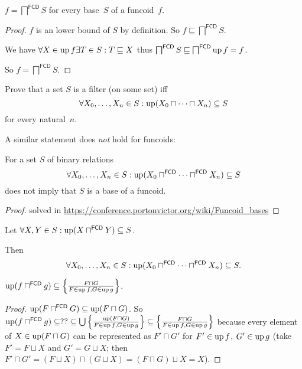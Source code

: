 \begin{prop}
$f = \bigsqcap^{\mathsf{FCD}} S$ for every base~$S$ of a funcoid~$f$.
\end{prop}

\begin{proof}
$f$ is an lower bound of $S$ by definition. So $f \sqsubseteq
\bigsqcap^{\mathsf{FCD}} S$.

We have $\forall X \in \operatorname{up} f \exists T \in S : T \sqsubseteq X$ thus
$\bigsqcap^{\mathsf{FCD}} S \sqsubseteq \bigsqcap^{\mathsf{FCD}}
\operatorname{up} f = f$.

So $f = \bigsqcap^{\mathsf{FCD}} S$.
\end{proof}

\begin{xca}
Prove that a set $S$ is a filter (on some set) iff
\[ \forall X_0,\dots,X_n\in S:\operatorname{up}(X_0\sqcap\dots\sqcap X_n)\subseteq S \]
for every natural~$n$.
\end{xca}

A similar statement does \emph{not} hold for funcoids:

\begin{example}
For a set $S$ of binary relations
\[ \forall X_0,\dots,X_n\in S:\operatorname{up}(X_0\sqcap^{\mathsf{FCD}}\dots\sqcap^{\mathsf{FCD}} X_n)\subseteq S \]
does not imply that $S$ is a base of a funcoid.
\end{example}

\begin{proof}
solved in \url{https://conference.portonvictor.org/wiki/Funcoid_bases}
\end{proof}

\begin{conjecture}
  Let $\forall X,Y\in S:\operatorname{up}(X\sqcap^{\mathsf{FCD}} Y)\subseteq S$.
  
  Then
  \[ \forall X_0,\dots,X_n\in S:\operatorname{up}(X_0\sqcap^{\mathsf{FCD}}\dots\sqcap^{\mathsf{FCD}} X_n)\subseteq S. \]
\end{conjecture}


\begin{prop}
$\operatorname{up} (f \sqcap^{\mathsf{FCD}} g) \subseteq \left\{ \frac{ F \sqcap G }{ F \in \operatorname{up} f, G \in \operatorname{up} g }\right\}$.
\end{prop}

\begin{proof}
$\operatorname{up} (F \sqcap^{\mathsf{FCD}} G) \subseteq \operatorname{up} (F
\sqcap G)$. So $\operatorname{up} (f \sqcap^{\mathsf{FCD}} g) \subseteq ?? \subseteq \bigcup
\left\{ \frac{ \operatorname{up} (F \sqcap G) }{ F \in \operatorname{up} f,
G \in \operatorname{up} g }\right\} \subseteq \left\{ \frac{ F \sqcap G }{ F \in \operatorname{up} f, G \in \operatorname{up} g }\right\}$ because every
element of $X \in \operatorname{up} (F \sqcap G)$ can be represented as $F' \sqcap G'$
for $F' \in \operatorname{up} f$, $G' \in \operatorname{up} g$ (take $F' = F \sqcup X$ and $G'
= G \sqcup X$; then $F' \sqcap G' = (F \sqcup X) \sqcap (G \sqcup X) = (F
\sqcap G) \sqcup X = X$).
\end{proof}

